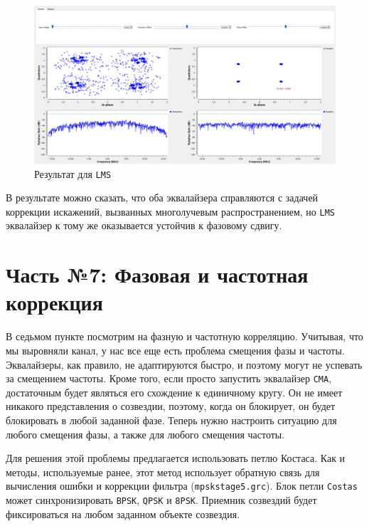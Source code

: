 \documentclass[a4paper]{article}
\begin{document}
            \begin{figure}[H]
                \centering
                \includegraphics[width=\textwidth]{ex_6_4.png}
                \caption{Результат для \texttt{LMS}}
                \label{fig:ex_6_4}
            \end{figure}
            
            В результате можно сказать, что оба эквалайзера справляются с задачей коррекции искажений, вызванных многолучевым распространением, но \texttt{LMS} эквалайзер к тому же оказывается устойчив к фазовому сдвигу.

    \newpage
        \section{Часть №7: Фазовая и частотная коррекция}
            В седьмом пункте посмотрим на фазную и частотную корреляцию. Учитывая, что мы выровняли канал, у нас все еще есть проблема смещения фазы и частоты. Эквалайзеры, как правило, не адаптируются быстро, и поэтому могут не успевать за смещением частоты. Кроме того, если просто запустить эквалайзер \texttt{CMA}, достаточным будет являться его схождение к единичному кругу. Он не имеет никакого представления о созвездии, поэтому, когда он блокирует, он будет блокировать в любой заданной фазе. Теперь нужно настроить ситуацию для любого смещения фазы, а также для любого смещения частоты.
            
            Для решения этой проблемы предлагается использовать петлю Костаса. Как и методы, используемые ранее, этот метод использует обратную связь для вычисления ошибки и коррекции фильтра (\texttt{mpskstage5.grc}). Блок петли \texttt{Costas} может синхронизировать \texttt{BPSK}, \texttt{QPSK} и \texttt{8PSK}. Приемник созвездий будет фиксироваться на любом заданном объекте созвездия.
            
\end{document}
